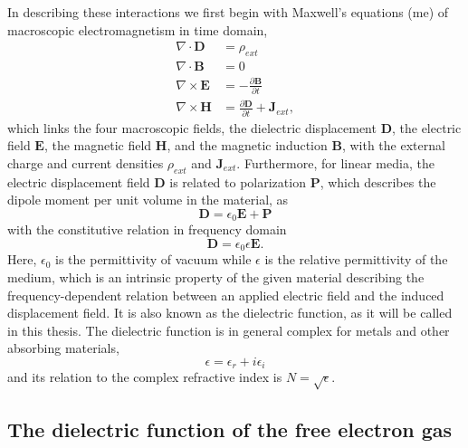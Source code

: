 In describing these interactions we first begin with Maxwell's equations (\ac{me}) of macroscopic electromagnetism in time domain\cite{griffiths},
\begin{subequations}
\begin{align}
    \nabla \cdot \mathbf{D} &= \rho_{ext}    \\
    \nabla \cdot \mathbf{B} &= 0            \\
    \nabla \times \mathbf{E} &= -\frac{\partial \mathbf{B}}{\partial t}                 \\
    \nabla \times \mathbf{H} &= \frac{\partial \mathbf{D}}{\partial t} + \mathbf{J}_{ext},
\end{align}
\label{eq:ME}
\end{subequations}
which links the four macroscopic fields, the dielectric displacement $\mathbf{D}$, the electric field $\mathbf{E}$, the magnetic field $\mathbf{H}$, and the magnetic induction $\mathbf{B}$, with the external charge and current densities $\rho_{ext}$ and $\mathbf{J}_{ext}$. Furthermore, for linear media, the electric displacement field $\mathbf{D}$ is related to polarization $\mathbf{P}$, which describes the dipole moment per unit volume in the material, as \cite{hans_arwin}
\begin{equation}
    \mathbf{D} = \epsilon_0 \mathbf{E} + \mathbf{P}
    \label{eq:DEP}
\end{equation}
with the constitutive relation in frequency domain
\begin{equation}
   \mathbf{D} = \epsilon_0 \epsilon \mathbf{E}.    
    \label{eq:constitutive relation}
\end{equation}
Here, $\epsilon_0$ is the permittivity of vacuum while $\epsilon$ is the relative permittivity of the medium, which is an intrinsic property of the given material describing the frequency-dependent relation between an applied electric field and the induced displacement field. It is also known as the dielectric function, as it will be called in this thesis. The dielectric function is in general complex for metals and other absorbing materials,
\begin{equation}
    \epsilon = \epsilon_r + i\epsilon_i
\end{equation}
and its relation to the complex refractive index is $N=\sqrt{\epsilon}$.

\subsection{The dielectric function of the free electron gas}

